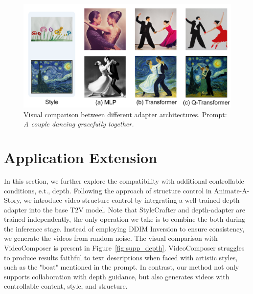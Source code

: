 \begin{figure}[h]
    \centering
    \includegraphics[width=\linewidth]{figures/supp/ablation_arch.pdf}
    \vspace{-1em}
    \caption{Visual comparison between different adapter architectures. Prompt: \textit{A couple dancing gracefully together.}}
    \label{fig:supp_ablation_arch}
\end{figure}

\section{Application Extension}
\label{sec:supp_app}


In this section, we further explore the compatibility with additional controllable conditions, e.t., depth. Following the approach of structure control in Animate-A-Story\cite{he2023animate}, we introduce video structure control by integrating a well-trained depth adapter into the base T2V model. Note that StyleCrafter and depth-adapter are trained independently, the only operation we take is to combine the both during the inference stage. Instead of employing DDIM Inversion to ensure consistency, we generate the videos from random noise. The visual comparison with VideoComposer\cite{wang2024videocomposer} is present in Figure~\ref{fig:supp_depth}. VideoComposer struggles to produce results faithful to text descriptions when faced with artistic styles, such as the "boat" mentioned in the prompt. In contrast, our method not only supports collaboration with depth guidance, but also generates videos with controllable content, style, and structure. 



